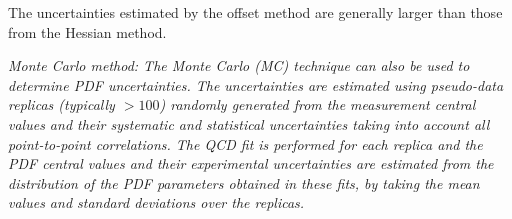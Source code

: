 \begin{description}
The uncertainties estimated by the offset method are generally larger than 
those from the Hessian method.
\\

\item \it{Monte Carlo method:} \rm
The Monte Carlo (MC) technique \cite{Giele:1998gw, mcmethod2} can also be used to determine PDF uncertainties.
The uncertainties are estimated using pseudo-data replicas (typically $>100$) 
randomly generated from the measurement central values and their systematic and statistical uncertainties 
taking into account all point-to-point correlations.
%
The QCD fit is performed for each replica and the PDF central values and their 
experimental uncertainties are estimated from the distribution of the PDF parameters obtained in these fits, by taking 
the mean values and standard deviations over the replicas.
%


\end{description}
